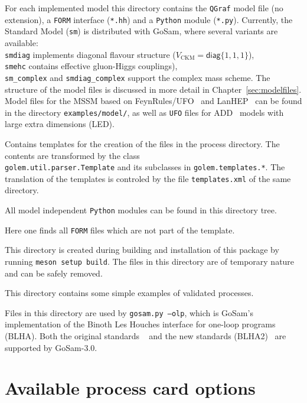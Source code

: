 \documentclass[11pt,a4paper]{refrep}
\newcommand{\gosamversion}{{3{.}0}}
\newcommand{\gosam}{{\sc GoSam}\xspace}
\newcommand{\gosamv}[1][\gosamversion]{{\sc GoSam}\xspace}
\newcommand{\qgraf}{{\tt QGraf}\xspace}
\newcommand{\form}{{\tt FORM}\xspace}
\newcommand{\python}{{\tt Python}\xspace}
\begin{document}
 For each implemented model this directory
contains the \qgraf model file (no extension), a \form interface
(\texttt{*.hh}) and a \python module (\texttt{*.py}). Currently,
the Standard Model (\texttt{sm}) is distributed with \gosamv, 
where several variants are available:\\
\texttt{smdiag} implements
diagonal flavour structure ($V_{\text{CKM}}=\mathsf{diag}\{1,1,1\}$),\\
{\tt smehc} contains effective gluon-Higgs couplings),\\
\texttt{sm\_complex} and \texttt{smdiag\_complex} support the complex mass scheme. 
The structure of the model files is discussed in more detail in
Chapter~\ref{sec:modelfiles}. Model files for the MSSM based on 
FeynRules/UFO~\cite{Degrande:2011ua}  and LanHEP~\cite{Semenov:2010qt}
can be found in the directory 
\texttt{examples/model/}, as well as {\tt UFO}  files for ADD~\cite{ArkaniHamed:1998rs}
models with large extra dimensions (LED).

 Contains templates for the creation
of the files in the process directory. The contents are transformed
by the class\\
\texttt{golem.util.parser.Template} and its subclasses
in \texttt{golem.templates.*}. The translation of the templates is
controled by the file \texttt{templates.xml} of the same directory.

 All model independent \python modules
can be found in this directory tree.

 Here one finds all \form files
which are not part of the template.

 This directory is created during
building and installation of this package by running \texttt{meson setup build}.
The files in this directory are of temporary nature and can be safely
removed.

 This directory contains some simple examples
of validated processes.

 Files in this directory are used by
\texttt{gosam.py --olp}, which is \gosamv's implementation of the
Binoth Les Houches interface for one-loop programs (BLHA).
Both the original standards ~\cite{Binoth:2010xt} and the new standards 
(BLHA2)~\cite{Alioli:2013nda} are supported by \gosam-\gosamversion.

\chapter{Available process card options} \label{chp:process_card_options}
\begin{adjustwidth}{-100pt}{0pt}

\end{adjustwidth}
\end{document}
